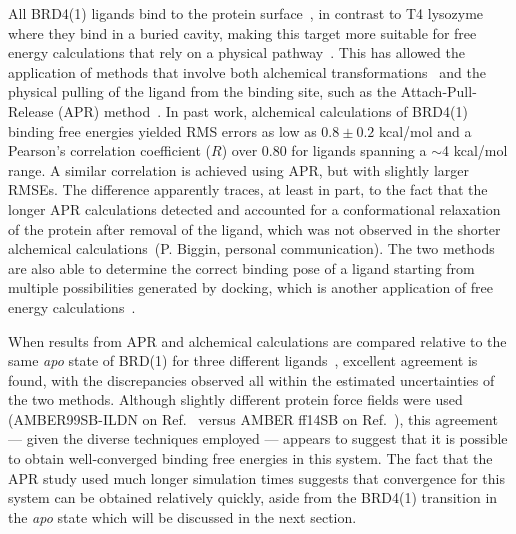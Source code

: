 \documentclass[aps,pre,twocolumn,nofootinbib,superscriptaddress,10pt, final,tightenlines]{revtex4-1}
\begin{document}
All BRD4(1) ligands bind to the protein surface~\cite{Filippa:2014:Nat.Rev.DrugDiscov., Fill:2012:Bioorg.Med.Chem., Xue:2016:J.Med.Chem.}, in contrast to T4 lysozyme where they bind in a buried cavity, making this target more suitable for free energy calculations that rely on a physical pathway~\cite{Heinzelmann:2017:J.Chem.TheoryComput., Kuang:2015:J.Chem.Inf.Model., Muvva:2014:Mol.Biosyst.}. 
This has allowed the application of methods that involve both alchemical transformations~\cite{aldeghi_accurate_2016, Aldeghi:2017:J.Am.Chem.Soc.} and the physical pulling of the ligand from the binding site, such as the Attach-Pull-Release (APR) method~\cite{Heinzelmann:2017:J.Chem.TheoryComput.,velez-vega_overcoming_2013, henriksen_computational_2015}.  
In past work, alchemical calculations of BRD4(1) binding free energies yielded RMS errors as low as $0.8\pm0.2$ kcal/mol and a Pearson's correlation coefficient ($R$) over $0.80$ for ligands spanning a $\sim$4 kcal/mol range. 
A similar correlation is achieved using APR, but with slightly larger RMSEs. 
The difference apparently traces, at least in part, to the fact that the longer APR calculations detected and accounted for a conformational relaxation of the protein after removal of the ligand, which was not observed in the shorter alchemical calculations~\cite{aldeghi_accurate_2016}(P. Biggin, personal communication).
The two methods are also able to determine the correct binding pose of a ligand starting from multiple possibilities generated by docking, which is another application of free energy calculations~\cite{Kaus:2015:J.Chem.TheoryComput.}. 


When results from APR and alchemical calculations are compared relative to the same \emph{apo} state of BRD(1) for three different ligands~\cite{Heinzelmann:2017:J.Chem.TheoryComput.}, excellent agreement is found, with the discrepancies observed all within the estimated uncertainties of the two methods. 
Although slightly different protein force fields were used (AMBER99SB-ILDN on Ref.~\cite{aldeghi_accurate_2016} versus AMBER ff14SB on Ref.~\cite{Heinzelmann:2017:J.Chem.TheoryComput.}), this agreement --- given the diverse techniques employed --- appears to suggest that it is possible to obtain well-converged binding free energies in this system. 
The fact that the APR study used much longer simulation times suggests that convergence for this system can be obtained relatively quickly, aside from the BRD4(1) transition in the \emph{apo} state which will be discussed in the next section. 
\end{document}
